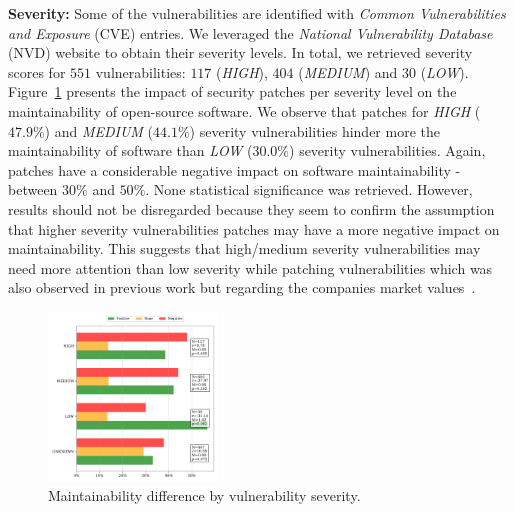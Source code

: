 \documentclass[10pt,conference]{IEEEtran}
\begin{document}
\textbf{Severity:} Some of the vulnerabilities are identified with \emph{Common 
Vulnerabilities and Exposure} (CVE) entries. We leveraged the \emph{National Vulnerability 
Database} (NVD) website to obtain their severity levels. In total, we 
retrieved severity scores for $551$ vulnerabilities: $117$ (\emph{HIGH}), 
$404$ (\emph{MEDIUM}) and $30$ (\emph{LOW}). Figure~\ref{fig:severity} 
presents the impact of security patches per severity level on the 
maintainability of open-source software. We observe that patches for 
\emph{HIGH} ($47.9\%$) and \emph{MEDIUM} ($44.1\%$) severity vulnerabilities 
hinder more the maintainability of software than \emph{LOW} ($30.0\%$) 
severity vulnerabilities. Again, patches have a considerable 
negative impact on software maintainability - between $30\%$ 
and $50\%$. None statistical significance was retrieved. However, 
results should not be disregarded because they seem to confirm the 
assumption that higher severity vulnerabilities patches may have a 
more negative impact on maintainability. This suggests that high/medium 
severity vulnerabilities may need more attention than low severity while 
patching vulnerabilities which was also observed in previous work but 
regarding the companies market values~\cite{4267025}.


\begin{figure}[h]
 	\centering 	\includegraphics[width=0.4\textwidth]{figures/main_per_severity.pdf}
 	\caption{Maintainability difference by vulnerability severity.}
	\label{fig:severity}
\end{figure}
\end{document}
